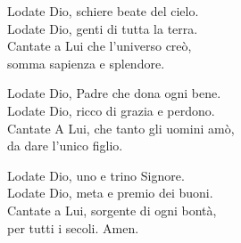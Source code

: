 
\strofa Lodate Dio, schiere beate del cielo.\\
Lodate Dio, genti di tutta la terra.\\
Cantate a Lui che l'universo creò,\\
somma sapienza e splendore.

\spazio

\strofa Lodate Dio, Padre che dona ogni bene.\\
Lodate Dio, ricco di grazia e perdono.\\
Cantate A Lui, che tanto gli uomini amò,\\
da dare l'unico figlio.

\spazio

\strofa Lodate Dio, uno e trino Signore.\\
Lodate Dio, meta e premio dei buoni.\\
Cantate a Lui, sorgente di ogni bontà,\\
per tutti i secoli. Amen.